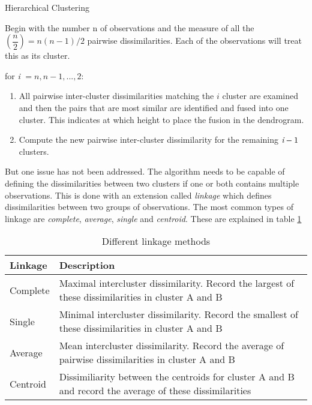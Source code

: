 \begin{algorithm}
	\caption{Hierarchical Clustering}
	\label{algo:HierarchicalClustering}
	\begin{algorithmic}[1]
 		\State Begin with the number n of observations and the measure of all the $(\dfrac{n}{2}) =n(n-1)/2 $ pairwise dissimilarities. Each of the observations will treat this as its cluster.
 		
 		\State for \emph{i} $= n,n-1,...,2:$
 		\begin{enumerate}[label=(\alph*)]
 			\item All pairwise inter-cluster dissimilarities matching the $i$ cluster are examined and then the pairs that are most similar are identified and fused into one cluster. This indicates at which height to place the fusion in the dendrogram.
 			\item Compute the new pairwise inter-cluster dissimilarity for the remaining $\emph{i}-1$ clusters.
 		\end{enumerate}
 	\end{algorithmic}
 \end{algorithm}

But one issue has not been addressed. The algorithm needs to be capable of defining the dissimilarities between two clusters if one or both contains multiple observations. This is done with an extension called \emph{linkage} which defines dissimilarities between two groups of observations. The most common types of linkage are \emph{complete}, \emph{average}, \emph{single} and
\emph{centroid}. These are explained in table \ref{table:linkage}

\begin{table}
	\begin{center}
		\begin{tabular}{ | l | p{12cm} |}
			\hline
			Linkage & Description \\ \hline
			Complete & Maximal intercluster dissimilarity. Record the largest of these dissimilarities in cluster A and B \\ \hline
			Single & Minimal intercluster dissimilarity. Record the smallest of these dissimilarities in cluster A and B \\ \hline
			Average & Mean intercluster dissimilarity. Record the average of pairwise dissimilarities in cluster A and B\\
			\hline
			Centroid & Dissimiliarity between the centroids for cluster A and B and record the average of these dissimilarities
			\\
			\hline
		\end{tabular}
	\end{center}
	\caption{Different linkage methods}
	\label{table:linkage}
\end{table}


